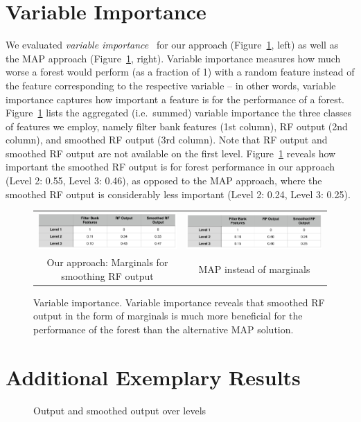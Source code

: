 \documentclass[10pt,twocolumn,letterpaper]{article}
\begin{document}
\section{Variable Importance}
We evaluated \emph{variable importance}~\cite{BreimanRF} for our approach (Figure~\ref{fig:var-importance}, left) as well as the MAP approach (Figure~\ref{fig:var-importance}, right). 
Variable importance measures how much worse a forest would perform (as a fraction of 1) with a random feature instead of the feature corresponding to the respective variable -- in other words, variable importance captures how important a feature is for the performance of a forest. 
%
Figure~\ref{fig:var-importance} lists the aggregated (i.e.\ summed) variable importance the three classes of features we employ, namely filter bank features (1st column), RF output (2nd column), and smoothed RF output (3rd column). Note that RF output and smoothed RF output are not available on the first level. 
%
Figure~\ref{fig:var-importance} reveals how important the smoothed RF output is for forest performance in our approach (Level 2: 0.55, Level 3: 0.46), as opposed to the MAP approach, where the smoothed RF output is considerably less important (Level 2: 0.24, Level 3: 0.25). 
%
%
\begin{figure}[h!]
\begin{center}
\begin{tabular}{cc}
\includegraphics[width=\columnwidth]{VariableImportance_Ours.jpg} &
\includegraphics[width=\columnwidth]{VariableImportance_MAP.jpg} \\
Our approach: Marginals for smoothing RF output & MAP instead of marginals \\
\end{tabular}
\caption{Variable importance. Variable importance reveals that smoothed RF output in the form of marginals is much more beneficial for the performance of the forest than the alternative MAP solution. }
\label{fig:var-importance}
\end{center}
\end{figure}

\section{Additional Exemplary Results}
%
\begin{figure}[t]
\begin{center}
\caption{Output and smoothed output over levels }
\label{fig:output-over-levels}
\end{center}
\end{figure}

{\small


}
\end{document}
